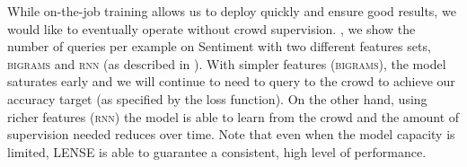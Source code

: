 While on-the-job training allows us to deploy quickly and ensure good results, we would like to eventually operate without crowd supervision.
, we show the number of queries per example on Sentiment with two different features sets, \textsc{bigrams} and \textsc{rnn} (as described in ).
With simpler features (\textsc{bigrams}),
the model saturates early and we will continue to need to query to the crowd to achieve our accuracy target (as specified by the loss function).
On the other hand, using richer features (\textsc{rnn}) the model is able to learn from the crowd and the amount of supervision needed reduces over time.
Note that even when the model capacity is limited, LENSE is able to guarantee a consistent, high level of performance.




